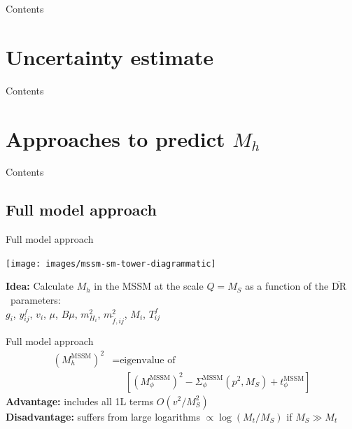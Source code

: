 \documentclass[hyperref={pdfpagelabels=false},ngerman]{beamer}
\renewcommand{\emph}{\textbf}
\newcommand{\DRbar}{\ensuremath{\overline{\text{DR}}}}
\begin{document}
\begin{frame}{Contents}
  \tableofcontents[currentsection]  
\end{frame}


\section{Uncertainty estimate}

\begin{frame}{Contents}
  \tableofcontents[currentsection]  
\end{frame}

\begin{frame}{Uncertainty estimate}
  \begin{center}
    \texttt{[image: \{\{plots/uncertainties/DMh\_MS\_TB-5\_Xt-1]}}}
  \end{center}
\end{frame}


\section{Approaches to predict $M_h$}

\begin{frame}{Contents}
  \tableofcontents[currentsection]  
\end{frame}

\subsection{Full model approach}

\begin{frame}{Full model approach}
  \begin{center}
    \texttt{[image: images/mssm-sm-tower-diagrammatic]}\\[1em]
  \end{center}
  \emph{Idea:} Calculate $M_h$ in the MSSM at the scale $Q = M_S$ as a function of the \DRbar\ parameters:\\[1em]
  \centering $g_i$, $y^f_{ij}$, $v_i$, $\mu$, $B\mu$, $m^2_{H_i}$,
  $m_{\tilde{f},ij}^2$, $M_i$, $T^f_{ij}$
\end{frame}

\begin{frame}{Full model approach}
  \begin{align*}
    (M_h^\text{MSSM})^2 &= \text{eigenvalue of} \\
    &\phantom{={}} \left[(M_\phi^\text{MSSM})^2 - \Sigma^\text{MSSM}_\phi(p^2,M_S)
      + t_\phi^\text{MSSM}\right]
  \end{align*}
  \emph{Advantage:} includes all 1L terms $O(v^2/M_S^2)$\\
  \emph{Disadvantage:} suffers from large logarithms $\propto\log(M_t/M_S)$ if $M_S\gg M_t$\\
\end{frame}
\end{document}
